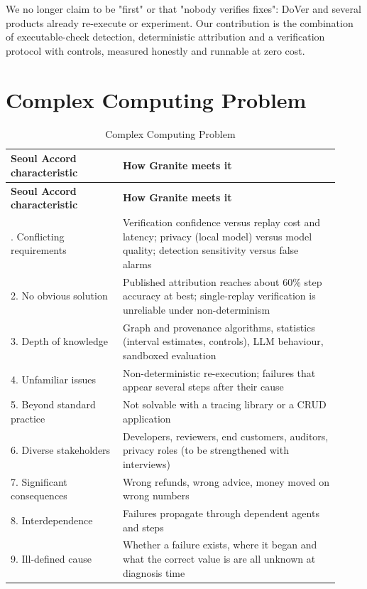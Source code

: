 We no longer claim to be "first" or that "nobody verifies fixes": DoVer and several products already re-execute or experiment. Our contribution is the combination of executable-check detection, deterministic attribution and a verification protocol with controls, measured honestly and runnable at zero cost.

\section{Complex Computing Problem}

{\small
\begin{longtable}{>{\raggedright\arraybackslash\hspace{0pt}}p{0.312\linewidth}>{\raggedright\arraybackslash\hspace{0pt}}p{0.608\linewidth}}
\caption{Complex Computing Problem}\label{tab:chapter2_research-2}\\
\toprule
\textbf{Seoul Accord characteristic~\cite{seoulaccord}} & \textbf{How Granite meets it} \\
\midrule
\endfirsthead
\toprule
\textbf{Seoul Accord characteristic~\cite{seoulaccord}} & \textbf{How Granite meets it} \\
\midrule
\endhead
\bottomrule
\endlastfoot
1. Conflicting requirements & Verification confidence versus replay cost and latency; privacy (local model) versus model quality; detection sensitivity versus false alarms \\
2. No obvious solution & Published attribution reaches about 60\% step accuracy at best; single-replay verification is unreliable under non-determinism \\
3. Depth of knowledge & Graph and provenance algorithms, statistics (interval estimates, controls), LLM behaviour, sandboxed evaluation \\
4. Unfamiliar issues & Non-deterministic re-execution; failures that appear several steps after their cause \\
5. Beyond standard practice & Not solvable with a tracing library or a CRUD application \\
6. Diverse stakeholders & Developers, reviewers, end customers, auditors, privacy roles (to be strengthened with interviews) \\
7. Significant consequences & Wrong refunds, wrong advice, money moved on wrong numbers \\
8. Interdependence & Failures propagate through dependent agents and steps \\
9. Ill-defined cause & Whether a failure exists, where it began and what the correct value is are all unknown at diagnosis time \\
\end{longtable}
}

